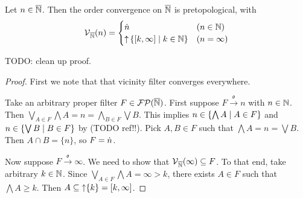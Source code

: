 \begin{lemma} \label{extendedNaturalsOrderConvergenceVicinities}
Let $n\in\overline{\mathbb{N}}$. Then the order convergence on $\overline{\mathbb{N}}$ is pretopological, with
\[ \vicinity_{\overline{\N}}(n) = \begin{cases}
\pfilter{n} & (n\in \N) \\
\upset \setbuilder{\interval{k, \infty}}{k\in \N} & (n = \infty)
\end{cases} \]
\end{lemma}
TODO: clean up proof.
\begin{proof}
First we note that that vicinity filter converges everywhere.

Take an arbitrary proper filter $F\in\operatorname{\mathcal{FP}}(\overline{\mathbb{N}})$. First suppose $F\overset{\mathfrak{o}}{\longrightarrow} n$ with $n\in \mathbb{N}$. Then $\bigvee_{A\in F}\bigwedge A = n = \bigwedge_{B\in F}\bigvee B$. This implies $n\in \setbuilder{\bigwedge A}{A\in F}$ and $n\in \setbuilder{\bigvee B}{B\in F}$ by (TODO ref!!). Pick $A,B\in F$ such that $\bigwedge A = n = \bigvee B$. Then $A\cap B = \{n\}$, so $F = \dot{n}$.

Now suppose $F\overset{\mathfrak{o}}{\longrightarrow} \infty$. We need to show that $\operatorname{\mathcal{V}}_{\overline{\mathbb{N}}}(\infty) \subseteq F$. To that end, take arbitrary $k\in \mathbb{N}$. Since $\bigvee_{A\in F} \bigwedge A = \infty > k$, there exists $A\in F$ such that $\bigwedge A \geq k$. Then $A\subseteq \upset\{k\} = \interval{k,\infty}$.
\end{proof}

